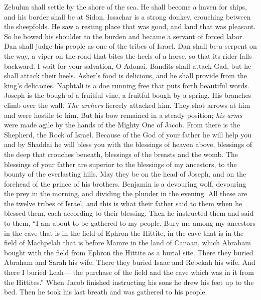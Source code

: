 \begin{biblechapter}
\verse Zebulun shall settle by the shore of the sea. 
He shall become a haven for ships, 
and his border shall be at Sidon.
\verse Issachar is a strong donkey, 
crouching between the sheepfolds.
\verse He saw a resting place that was good, 
and land that was pleasant. 
So he bowed his shoulder to the burden 
and became a servant of forced labor.
\verse Dan shall judge his people 
as one of the tribes of Israel.
\verse Dan shall be a serpent on the way, 
a viper on the road 
that bites the heels of a horse, 
so that its rider falls backward.
\verse I wait for your salvation, O Adonai.
\verse Bandits shall attack Gad, 
but he shall attack their heels.
\verse Asher’s food is delicious, 
and he shall provide from the king’s delicacies.
\verse Naphtali is a doe running free 
that puts forth beautiful words.
\verse Joseph is the bough of a fruitful vine, 
a fruitful bough by a spring. 
His branches climb over the wall.
\verse \textit{The archers} fiercely attacked him. 
They shot arrows at him and were hostile to him.
\verse But his bow remained in a steady position; 
\textit{his arms} were made agile 
by the hands of the Mighty One of Jacob. 
From there is the Shepherd, the Rock of Israel.
\verse Because of the God of your father he will help you 
and by Shaddai he will bless you 
with the blessings of heaven above, 
blessings of the deep that crouches beneath, 
blessings of the breasts and the womb.
\verse The blessings of your father 
are superior to the blessings of my ancestors, 
to the bounty of the everlasting hills. 
May they be on the head of Joseph, 
and on the forehead of the prince of his brothers.
\verse Benjamin is a devouring wolf, 
devouring the prey in the morning, 
and dividing the plunder in the evening.
 All these are the twelve tribes of Israel, and this is what their father said to them when he blessed them, each according to their blessing.
\verse Then he instructed them and said to them, “I am about to be gathered to my people. Bury me among my ancestors in the cave that is in the field of Ephron the Hittite,
\verse in the cave that is in the field of Machpelah that is before Mamre in the land of Canaan, which Abraham bought with the field from Ephron the Hittite as a burial site.
\verse There they buried Abraham and Sarah his wife. There they buried Isaac and Rebekah his wife. And there I buried Leah—
\verse the purchase of the field and the cave which was in it from the Hittites.”
\verse When Jacob finished instructing his sons he drew his feet up to the bed. Then he took his last breath and was gathered to his people.
\end{biblechapter}

